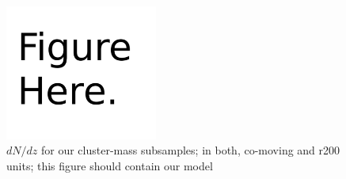 \begin{figure}
 \begin{minipage}{0.5\textwidth}
    \centering
    \includegraphics[width=5cm]{figs/figure_sample.pdf}
  \end{minipage}

\caption{$dN/dz$ for our cluster-mass subsamples; in both, co-moving and r200 units; this figure should contain our model}
\label{fig:fig3}

\end{figure}
